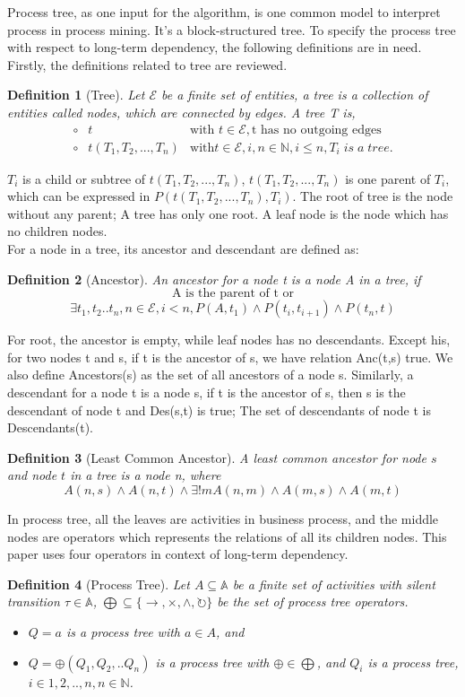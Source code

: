 \documentclass[]{article}
\newtheorem{mydef}{Definition}[section]
\begin{document}
Process tree, as one input for the algorithm, is one common model to interpret process in process mining. It's a block-structured tree. To specify the process tree with respect to long-term dependency, the following definitions are in need. Firstly, the definitions related to tree are reviewed.
\begin{mydef}[Tree]
	Let $ \mathscr{E} $ be a finite set of entities, a tree is a collection of entities called nodes, which are connected by edges. A tree T is,
	\[
	\begin{array}{ rll}
		\circ&t & \mbox{with } t\in \mathscr{E},  \text{t has no outgoing edges}\\
		\circ&t(T_1,T_2,...,T_n) & \mbox{with} t\in \mathscr{E}, i,n\in \mathbb{N}, i \leq n ,T_i\;is\; a\; tree.
	\end{array}
	\]
\end{mydef}
$T_i$ is a child or subtree of $t(T_1,T_2,...,T_n)$, $t(T_1,T_2,...,T_n)$ is one parent of $T_i$, which can be expressed in $P(t(T_1,T_2,...,T_n),T_i)$. The root of tree is the node without any parent; A tree has only one root. A leaf node is the node which has no children nodes.\\
For a node in a tree, its ancestor and descendant are defined as:
\begin{mydef}[Ancestor]
	An ancestor for a node t is a node A in a tree, if 
	\[\text{A is the parent of t or} \]
	\[ \exists t_1,t_2..t_n,n\in \mathscr{E}, i < n, P(A,t_1)\land P(t_i,t_{i+1}) \land P(t_n,t) \]
\end{mydef}
For root, the ancestor is empty, while leaf nodes has no descendants. Except his, for two nodes t and s, if t is the ancestor of s, we have relation Anc(t,s) true. We also define Ancestors(s) as the set of all ancestors of a node s. Similarly, a descendant for a node t is a node s, if t is the ancestor of s, then s is the descendant of node t and Des(s,t) is true; The set of descendants of node t is Descendants(t).
\begin{mydef}[Least Common Ancestor]
	A least common ancestor for node $s$ and node $t$ in a tree is a node n, where 
	\[A(n,s) \land A(n,t) \land \exists! m A(n,m) \land A(m,s) \land A(m,t) \]
\end{mydef}
In process tree, all the leaves are activities in business process, and the middle nodes are operators which represents the relations of all its children nodes\cite{vanderAalst:2016:PMD:2948762,leemans2013discovering}. This paper uses four operators in context of long-term dependency.
\begin{mydef}[Process Tree]
	Let $ A \subseteq \mathbb{A} $ be a finite set of activities with silent transition $\tau \in \mathbb{A}$, $\bigoplus \subseteq \{\rightarrow, \times, \land, \circlearrowright\}$ be the set of process tree operators. 
	\begin{itemize}
		\item $Q=a$ is a process tree with $a\in A$, and 
		\item $Q= \oplus (Q_1 , Q_2 ,.. Q_n)$ is a process tree with $\oplus \in \bigoplus$, and $Q_i$ is a process tree, $i\in{1,2,..,n}, n\in \mathbb{N}$. 
	\end{itemize}
\end{mydef}
\end{document}
